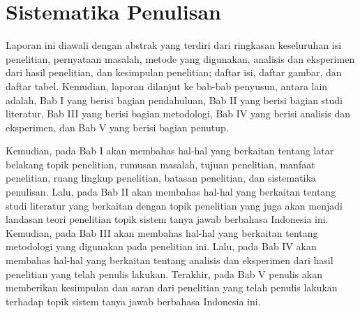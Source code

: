 \section{Sistematika Penulisan}
Laporan ini diawali dengan abstrak yang terdiri dari ringkasan keseluruhan isi penelitian, pernyataan masalah, metode yang digunakan, analisis dan eksperimen dari hasil penelitian, dan kesimpulan penelitian; daftar isi, daftar gambar, dan daftar tabel. Kemudian, laporan dilanjut ke bab-bab penyusun, antara lain adalah, Bab I yang berisi bagian pendahuluan, Bab II yang berisi bagian studi literatur, Bab III yang berisi bagian metodologi, Bab IV yang berisi analisis dan eksperimen, dan Bab V yang berisi bagian penutup. 

Kemudian, pada Bab I akan membahas hal-hal yang berkaitan tentang latar belakang topik penelitian, rumusan masalah, tujuan penelitian, manfaat penelitian, ruang lingkup penelitian, batasan penelitian, dan sistematika penulisan. Lalu, pada Bab II akan membahas hal-hal yang berkaitan tentang studi literatur yang berkaitan dengan topik penelitian yang juga akan menjadi landasan teori penelitian topik sistem tanya jawab berbahasa Indonesia ini. Kemudian, pada Bab III akan membahas hal-hal yang berkaitan tentang metodologi yang digunakan pada penelitian ini. Lalu, pada Bab IV akan membahas hal-hal yang berkaitan tentang analisis dan eksperimen dari hasil penelitian yang telah penulis lakukan. Terakhir, pada Bab V penulis akan memberikan kesimpulan dan saran dari penelitian yang telah penulis lakukan terhadap topik sistem tanya jawab berbahasa Indonesia ini.